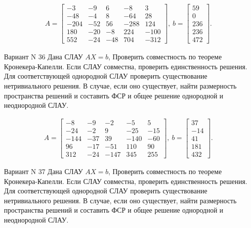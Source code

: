 \documentclass[11pt]{report}
\begin{document}
\begin{align*}
 A = \left[\begin{matrix}-3 & -9 & 6 & -8 & 3\\-48 & -4 & 8 & -64 & 28\\-204 & -52 & 56 & -288 & 124\\180 & -20 & -8 & 224 & -100\\552 & -24 & -48 & 704 & -312\end{matrix}\right],
\ b = \left[\begin{matrix}59\\0\\236\\236\\472\end{matrix}\right]. 
 \end{align*}

Вариант N 36
Дана СЛАУ $AX = b$,
Проверить совместность по теореме Кронекера-Капелли. Если СЛАУ совместна, проверить единственность решения.
Для соответствующей однородной СЛАУ проверить существование нетривиального решения. В случае, если оно существует,
найти размерность пространства решений и составить ФСР и общее решение однородной  и неоднородной СЛАУ.


\begin{align*}
 A = \left[\begin{matrix}-8 & -9 & -2 & -5 & 5\\-24 & -2 & 9 & -25 & -15\\-144 & -37 & 39 & -140 & -60\\96 & -17 & -51 & 110 & 90\\312 & -24 & -147 & 345 & 255\end{matrix}\right],
\ b = \left[\begin{matrix}37\\-14\\41\\181\\432\end{matrix}\right]. 
 \end{align*}

Вариант N 37
Дана СЛАУ $AX = b$,
Проверить совместность по теореме Кронекера-Капелли. Если СЛАУ совместна, проверить единственность решения.
Для соответствующей однородной СЛАУ проверить существование нетривиального решения. В случае, если оно существует,
найти размерность пространства решений и составить ФСР и общее решение однородной  и неоднородной СЛАУ.
\end{document}
